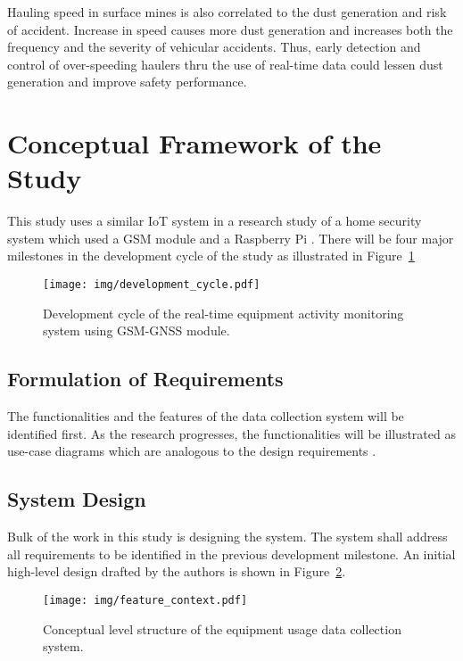 \documentclass[12pt]{report}
\begin{document}
Hauling speed in surface mines is also correlated to the dust generation and risk of accident.
Increase in speed causes more dust generation and increases both the frequency and the severity of vehicular accidents.
Thus, early detection and control of over-speeding haulers thru the use of real-time data could lessen dust generation and improve safety performance.

\section{Conceptual Framework of the Study}

This study uses a similar IoT system in a research study of a home security system which used a GSM module and a Raspberry Pi \cite{GSMRPi}.
There will be four major milestones in the development cycle of the study as illustrated in Figure~\ref{fig:development_cycle}

\begin{figure}[H]
    \centering
    \texttt{[image: img/development\_cycle.pdf]}
    \caption{Development cycle of the real-time equipment activity monitoring system using GSM-GNSS module.}
    \label{fig:development_cycle}
\end{figure}

\subsection{Formulation of Requirements}

The functionalities and the features of the data collection system will be identified first.
As the research progresses, the functionalities will be illustrated as use-case diagrams which are analogous to the design requirements \cite{UseCase}.

\subsection{System Design}

Bulk of the work in this study is designing the system.
The system shall address all requirements to be identified in the previous development milestone.
An initial high-level design drafted by the authors is shown in Figure~\ref{fig:concept_structure}.

\begin{figure}[H]
    \centering
    \texttt{[image: img/feature\_context.pdf]}
    \caption{Conceptual level structure of the equipment usage data collection system.}
    \label{fig:concept_structure}
\end{figure}
\end{document}
